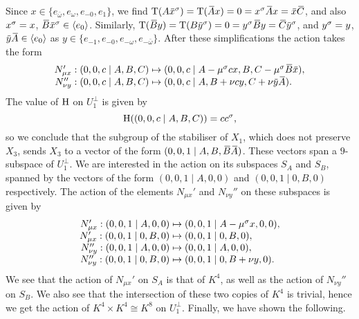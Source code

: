 Since $x \in \{e_{\bar{\omega}}, e_{\omega}, e_{-0}, e_1\}$, we find $\Tr(A\ovx^{\s}) = 
\Tr(\ovA x) = 0 = x^{\s} \ovA x = \ovx \ovC$, and also $x^{\sigma} = x$, $\ovB \ovx^{\s} \in 
\langle e_0 \rangle$. Similarly, $\Tr(\ovB y) = \Tr(B\ovy^{\s}) = 0 = y^{\s} \ovB y = \ovC \ovy^{\s}$,
and $y^{\sigma} = y$, $\ovy \ovA \in \langle e_0 \rangle$ as $y \in \{ e_{-1}, e_{-0}, e_{-\omega}, 
e_{-\bar{\omega}} \}$. After these simplifications the action takes the form
\begin{equation}
	\begin{array}{r@{\;}c@{\;}l}
		N_{\mu x}' : (0,0,c\mid A,B,C) & \mapsto &
			(0,0,c\mid A  - \mu^{\s} c x, B, C - \mu^{\s}\ovB\ovx ), \\
		
		N_{\nu y}'' : (0,0,c\mid A,B,C) & \mapsto &
			(0,0,c\mid A, B + \nu c y, C + \nu \ovy \ovA).
	\end{array}
\end{equation}
The value of $\mathrm{H}$ on $U_1^{\perp}$ is given by
\begin{equation}
	\mathrm{H}((0,0,c\mid A,B,C)) = c c^{\sigma},
\end{equation}
so we conclude that the subgroup of the stabiliser of $X_1$, which does not preserve $X_3$, 
sends $X_3$ to a vector of the form $(0,0,1\mid A,B, \ovB \ovA)$. These vectors span a 
$9$-subspace of $U_1^{\perp}$. We are interested in the action on its subspaces
$S_A$ and $S_B$, spanned by the vectors of the form $(0,0,1\mid A,0,0)$ and 
$(0,0,1\mid 0,B,0)$ respectively. The action of the elements $N_{\mu x}'$ and $N_{\nu y}''$ 
on these subspaces is given by
\begin{equation}
	\begin{array}{r@{\;}c@{\;}l}
		N_{\mu x}' : (0,0,1\mid A,0,0) & \mapsto & 
			(0,0,1\mid A -\mu^{\s} x , 0, 0), \\
			
		N_{\mu x}' : (0,0,1\mid 0,B,0) & \mapsto &
			(0,0,1\mid 0,B,0), \\
			
		N_{\nu y}'' : (0,0,1\mid A,0,0) & \mapsto &
			(0,0,1\mid A,0,0), \\
			
		N_{\nu y}'' : (0,0,1\mid 0,B,0) & \mapsto &
			(0,0,1\mid 0,B + \nu y, 0).
	\end{array}
\end{equation}
We see that the action of $N_{\mu x}'$ on $S_A$ is that of $K^4$, as well as the action
of $N_{\nu y}''$ on $S_B$. We also see that the intersection of these two copies of $K^4$
is trivial, hence we get the action of $K^4 \times K^4 \cong K^8$ on $U_1^{\perp}$. 
Finally, we have shown the following.

